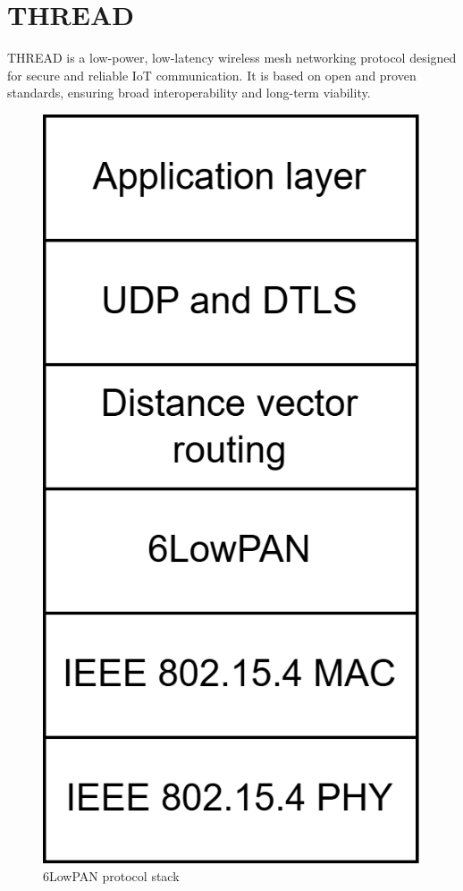 \section{THREAD}

THREAD is a low-power, low-latency wireless mesh networking protocol designed for secure and reliable IoT communication. 
It is based on open and proven standards, ensuring broad interoperability and long-term viability.
\begin{figure}[H]
    \centering
    \includegraphics[width=0.25\linewidth]{images/iot15.png}
    \caption{6LowPAN protocol stack}
\end{figure}

